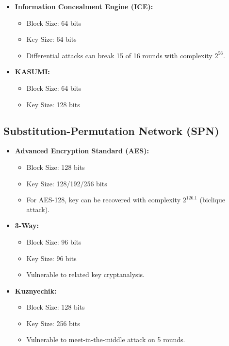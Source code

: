\documentclass[12pt]{article}
\begin{document}
\begin{large}
\begin{itemize}[itemsep=-1ex, topsep=-1ex]
\item \textbf{Information Concealment Engine (ICE):}
	\begin{itemize}[itemsep=-2ex, topsep=-2ex]
	\item Block Size: 64 bits
	\item Key Size: 64 bits
	\item Differential attacks can break 15 of 16 rounds with complexity $2^{56}$.
	\end{itemize}
	
\item \textbf{KASUMI:}
	\begin{itemize}[itemsep=-2ex, topsep=-2ex]
	\item Block Size: 64 bits
	\item Key Size: 128 bits
	\end{itemize}

\end{itemize}

\subsection{Substitution-Permutation Network (SPN)}
\begin{itemize}[itemsep=-1ex, topsep=-1ex]

\item \textbf{Advanced Encryption Standard (AES):}
	\begin{itemize}[itemsep=-2ex, topsep=-2ex]
	\item Block Size: 128 bits
	\item Key Size: 128/192/256 bits
	\item For AES-128, key can be recovered with complexity $2^{126.1}$ (biclique attack).
	\end{itemize}
	
\item \textbf{3-Way:}
	\begin{itemize}[itemsep=-2ex, topsep=-2ex]
	\item Block Size: 96 bits
	\item Key Size: 96 bits
	\item Vulnerable to related key cryptanalysis.
	\end{itemize}
	
\item \textbf{Kuznyechik:}
	\begin{itemize}[itemsep=-2ex, topsep=-2ex]
	\item Block Size: 128 bits
	\item Key Size: 256 bits
	\item Vulnerable to meet-in-the-middle attack on 5 rounds.
	\end{itemize}
	

\end{itemize}
\end{large}
\end{document}
